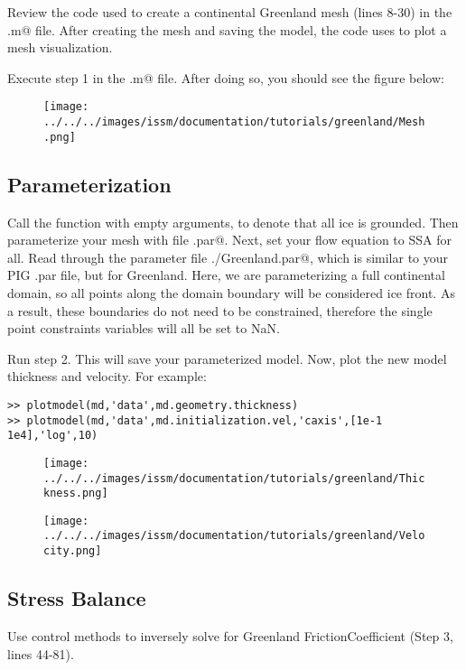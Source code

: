 Review the code used to create a continental Greenland mesh (lines 8-30) in the \verb@readme.m@ file. After creating the mesh and saving the model, the code uses \verb@plotmodel@ to plot a mesh visualization.

Execute step 1 in the \verb@runme.m@ file. After doing so, you should see the figure below:
\begin{figure}[H]
	\begin{center}
		\texttt{[image: ../../../images/issm/documentation/tutorials/greenland/Mesh.png]}
	\end{center}
\end{figure}
\subsection{Parameterization} %
Call the \verb@setmask@ function with empty arguments, to denote that all ice is grounded. Then parameterize your mesh with file \verb@Greenland.par@. Next, set your flow equation to SSA for all. Read through the parameter file \verb@./Greenland.par@, which is similar to your PIG .par file, but for Greenland. Here, we are parameterizing a full continental domain, so all points along the domain boundary will be considered ice front. As a result, these boundaries do not need to be constrained, therefore the single point constraints variables will all be set to NaN.

Run step 2. This will save your parameterized model. Now, plot the new model thickness and velocity. For example:
\begin{verbatim}>> plotmodel(md,'data',md.geometry.thickness)
>> plotmodel(md,'data',md.initialization.vel,'caxis',[1e-1 1e4],'log',10)\end{verbatim}

\begin{figure}[H]
	\begin{center}
		\texttt{[image: ../../../images/issm/documentation/tutorials/greenland/Thickness.png]}
	\end{center}
\end{figure}

\begin{figure}[H]
	\begin{center}
		\texttt{[image: ../../../images/issm/documentation/tutorials/greenland/Velocity.png]}
	\end{center}
\end{figure}
\subsection{Stress Balance} %
Use control methods to inversely solve for Greenland FrictionCoefficient (Step 3, lines 44-81).

